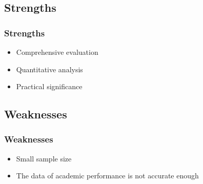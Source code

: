 \subsection{Strengths}
\begin{frame}
    \frametitle{Strengths}
    \Large
    \begin{itemize}[<+->]
        \item Comprehensive evaluation
        \item Quantitative analysis
        \item Practical significance
    \end{itemize}
\end{frame}

\subsection{Weaknesses}
\begin{frame}
    \frametitle{Weaknesses}
    \Large
    \begin{itemize}
        \item Small sample size
        \item The data of academic performance is not accurate enough
    \end{itemize}
\end{frame}